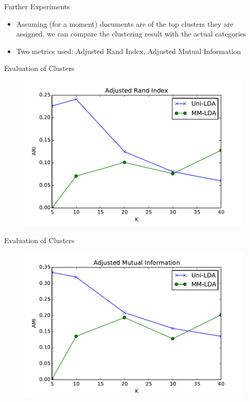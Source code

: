 \documentclass[pdf]{beamer}
\begin{document}
\begin{frame}{Further Experiments}
	\begin{itemize}
		\item	Assuming (for a moment) documents are of the top clusters they are assigned, we can compare the clustering result with the actual categories 
		\item Two metrics used: Adjusted Rand Index, Adjusted Mutual Information
	\end{itemize}
	
\end{frame}

\begin{frame}{Evaluation of Clusters}
\begin{figure}
\label{fig:ARI}
\includegraphics*[width=\textwidth]{ARI.pdf}
\end{figure}
\end{frame}
	
\begin{frame}{Evaluation of Clusters}
	\begin{figure}
	\label{fig:AMI}
	\includegraphics*[width=\textwidth]{AMI.pdf}
	\end{figure}
\end{frame}
\end{document}
